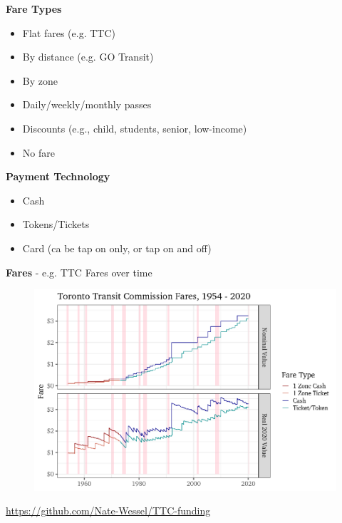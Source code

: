 \documentclass[aspectratio=169]{beamer}
\begin{document}
\begin{frame}
	
	\textbf{Fare Types}
	\begin{itemize}
		\item Flat fares (e.g. TTC)
		\item By distance (e.g. GO Transit)
		\item By zone
		\item Daily/weekly/monthly passes
		\item Discounts (e.g., child, students, senior, low-income)
		\item No fare
	\end{itemize}

	\textbf{Payment Technology}
	\begin{itemize}
		\item Cash
		\item Tokens/Tickets
		\item Card (ca be tap on only, or tap on and off)
	\end{itemize}
	
	
\end{frame}




\begin{frame}
	
	\textbf{Fares} - e.g. TTC Fares over time
	
	\begin{figure}
		\centering
		\includegraphics[width=0.8\linewidth]{images/ttc-fares.png}
	\end{figure}
	
	\tiny\url{https://github.com/Nate-Wessel/TTC-funding}
	
\end{frame}
\end{document}
